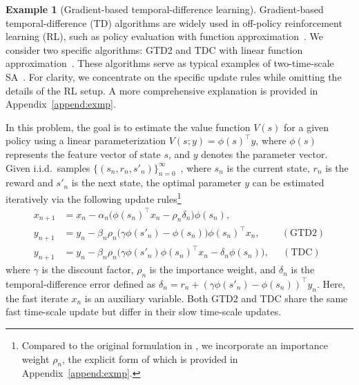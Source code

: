 \documentclass[11pt]{article}
\theoremstyle{plain}
\theoremstyle{definition}
\newtheorem{exam}{Example}[section]
\begin{document}
\begin{exam}[Gradient-based temporal-difference learning]\label{exmp:gtd}
	Gradient-based temporal-difference (TD) algorithms are widely used in off-policy reinforcement learning (RL), such as policy evaluation with function approximation~\citep{sutton2008convergent, sutton2009fast, maei2009convergent}.
	We consider two specific algorithms: GTD2 and TDC with linear function approximation~\citep{sutton2009fast}. These algorithms serve as typical examples of two-time-scale SA~\citep{dalal2018finite}. For clarity, we concentrate on the specific update rules while omitting the details of the RL setup. A more comprehensive explanation is provided in Appendix~\ref{append:exmp}.

	In this problem, the goal is to estimate the value function $V(s)$ for a given policy using a linear parameterization $V(s; y) = \phi(s)^\top y$, where $\phi(s)$ represents the feature vector of state $s$, and $y$ denotes the parameter vector.
	Given i.i.d.\ samples $\{ (s_n, r_n, s'_n) \}_{n=0}^\infty$~\citep{sutton2008convergent}, where $s_n$ is the current state, $r_n$ is the reward and $s'_n$ is the next state, the optimal parameter $y$ can be estimated iteratively via the following update rules\footnote{
	Compared to the original formulation in \cite{sutton2009fast}, we incorporate an importance weight $\rho_{n}$, the explicit form of which is provided in Appendix~\ref{append:exmp}.}
	\begin{align}
		x_{n+1} &= x_{n} - \alpha_{n} \big( \phi(s_{n})^{\top} x_{n} - \rho_{n} \delta_{n} \big) \phi(s_{n}), \label{eq:gtd-x}\\
		y_{n+1} &= y_{n} - \beta_{n} \rho_{n} \big( \gamma \phi(s'_{n}) - \phi(s_{n}) \big) \phi(s_{n})^\top x_{n}, \label{eq:gtd2-y}\  \qquad \mathrm{ (GTD2) }   \\
		y_{n+1} &= y_{n} - \beta_{n} \rho_{n} \big( \gamma \phi(s'_n) \phi(s_n)^\top x_{n} - \delta_{n} \phi(s_{n}) \big), \label{eq:tdc-y} \ \quad \,  \mathrm{ (TDC) }
	\end{align}
	where $\gamma$ is the discount factor, $\rho_{n}$ is the importance weight, and $\delta_{n}$ is the temporal-difference error defined as $	\delta_{n} = r_{n} + ( \gamma \phi(s'_{n}) - \phi(s_n) )^\top y_{n} $.
	Here, the fast iterate $x_{n}$ is an auxiliary variable.
	Both GTD2 and TDC share the same fast time-scale update but differ in their slow time-scale updates.
	

\end{exam}
\end{document}
